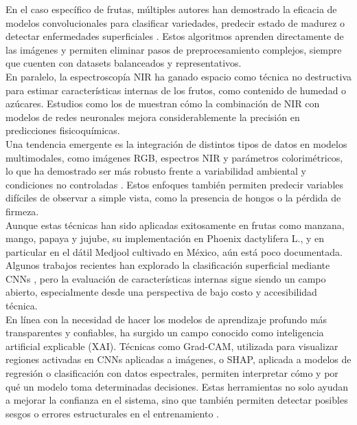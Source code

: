 En el caso específico de frutas, múltiples autores han demostrado la eficacia de modelos convolucionales para clasificar variedades, predecir estado de madurez o detectar enfermedades superficiales \parencite{rybacki_convolutional_2024, gill_fruit_2023, almomen_date_2023}. Estos algoritmos aprenden directamente de las imágenes y permiten eliminar pasos de preprocesamiento complejos, siempre que cuenten con datasets balanceados y representativos.\\

En paralelo, la espectroscopía NIR ha ganado espacio como técnica no destructiva para estimar características internas de los frutos, como contenido de humedad o azúcares. Estudios como los de \parencite{yuan_determination_2025, wang_improving_2025, chen_prediction_2024} muestran cómo la combinación de NIR con modelos de redes neuronales mejora considerablemente la precisión en predicciones fisicoquímicas.\\

Una tendencia emergente es la integración de distintos tipos de datos en modelos multimodales, como imágenes RGB, espectros NIR y parámetros colorimétricos, lo que ha demostrado ser más robusto frente a variabilidad ambiental y condiciones no controladas \parencite{said_smartripen_2025, passos_deep_2023}. Estos enfoques también permiten predecir variables difíciles de observar a simple vista, como la presencia de hongos o la pérdida de firmeza.\\

Aunque estas técnicas han sido aplicadas exitosamente en frutas como manzana, mango, papaya y jujube, su implementación en Phoenix dactylifera L., y en particular en el dátil Medjool cultivado en México, aún está poco documentada. Algunos trabajos recientes han explorado la clasificación superficial mediante CNNs \parencite{perez-perez_evaluation_2021}, pero la evaluación de características internas sigue siendo un campo abierto, especialmente desde una perspectiva de bajo costo y accesibilidad técnica.\\

En línea con la necesidad de hacer los modelos de aprendizaje profundo más transparentes y confiables, ha surgido un campo conocido como inteligencia artificial explicable (XAI). Técnicas como Grad-CAM, utilizada para visualizar regiones activadas en CNNs aplicadas a imágenes, o SHAP, aplicada a modelos de regresión o clasificación con datos espectrales, permiten interpretar cómo y por qué un modelo toma determinadas decisiones. Estas herramientas no solo ayudan a mejorar la confianza en el sistema, sino que también permiten detectar posibles sesgos o errores estructurales en el entrenamiento \parencite{russel_wavelet_2024, gupta_fruveg-net_2024}.\\

